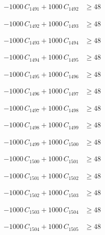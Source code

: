 \documentclass[a4paper,11pt]{article}
\begin{document}
\begin{align}
-1000\,C_{1491} + 1000\,C_{1492} &\geq 48 \nonumber
\end{align}

\begin{align}
-1000\,C_{1492} + 1000\,C_{1493} &\geq 48 \nonumber
\end{align}

\begin{align}
-1000\,C_{1493} + 1000\,C_{1494} &\geq 48 \nonumber
\end{align}

\begin{align}
-1000\,C_{1494} + 1000\,C_{1495} &\geq 48 \nonumber
\end{align}

\begin{align}
-1000\,C_{1495} + 1000\,C_{1496} &\geq 48 \nonumber
\end{align}

\begin{align}
-1000\,C_{1496} + 1000\,C_{1497} &\geq 48 \nonumber
\end{align}

\begin{align}
-1000\,C_{1497} + 1000\,C_{1498} &\geq 48 \nonumber
\end{align}

\begin{align}
-1000\,C_{1498} + 1000\,C_{1499} &\geq 48 \nonumber
\end{align}

\begin{align}
-1000\,C_{1499} + 1000\,C_{1500} &\geq 48 \nonumber
\end{align}

\begin{align}
-1000\,C_{1500} + 1000\,C_{1501} &\geq 48 \nonumber
\end{align}

\begin{align}
-1000\,C_{1501} + 1000\,C_{1502} &\geq 48 \nonumber
\end{align}

\begin{align}
-1000\,C_{1502} + 1000\,C_{1503} &\geq 48 \nonumber
\end{align}

\begin{align}
-1000\,C_{1503} + 1000\,C_{1504} &\geq 48 \nonumber
\end{align}

\begin{align}
-1000\,C_{1504} + 1000\,C_{1505} &\geq 48 \nonumber
\end{align}
\end{document}
